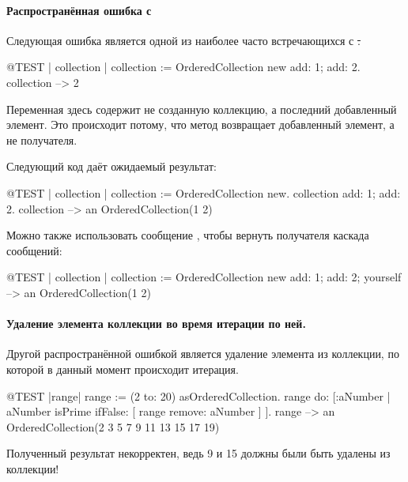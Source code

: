 \documentclass[a4paper,10pt,twoside]{book}
\begin{document}
\paragraph{Распространённая ошибка с } Следующая ошибка является одной из наиболее часто встречающихся с \st.

\begin{code}{@TEST | collection | }
collection := OrderedCollection new add: 1; add: 2.
collection --> 2
\end{code}
\noindent
Переменная  здесь содержит не созданную коллекцию, а последний добавленный элемент.
Это происходит потому, что метод  возвращает добавленный элемент, а не получателя.

Следующий код даёт ожидаемый результат:
\begin{code}{@TEST | collection |}
collection := OrderedCollection new.
collection add: 1; add: 2.
collection --> an OrderedCollection(1 2)
\end{code}

Можно также использовать сообщение , чтобы вернуть получателя каскада сообщений:

\begin{code}{@TEST | collection |}
collection := OrderedCollection new add: 1; add: 2; yourself --> an OrderedCollection(1 2)
\end{code}

\paragraph{Удаление элемента коллекции во время итерации по ней.} Другой распространённой ошибкой является удаление элемента из коллекции, по которой в данный момент происходит итерация.
\begin{code}{@TEST |range|}
range := (2 to: 20) asOrderedCollection.
range do: [:aNumber | aNumber isPrime ifFalse: [ range remove: aNumber ] ].
range --> an OrderedCollection(2 3 5 7 9 11 13 15 17 19)
\end{code}
\noindent
Полученный результат некорректен, ведь 9 и 15 должны были быть удалены из коллекции!
\end{document}
